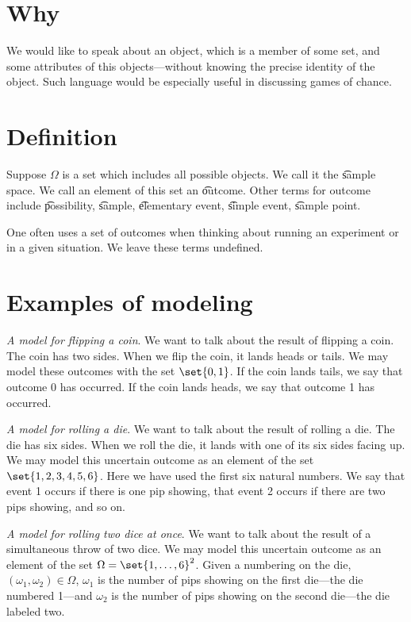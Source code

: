 

\section*{Why}

We would like to speak about an object, which is a member of some set, and some attributes of this objects---without knowing the precise identity of the object.
Such language would be especially useful in discussing games of chance.

\section*{Definition}

Suppose $\Omega $ is a set which includes all possible objects.
We call it the \t{sample space}.
We call an element of this set an \t{outcome}.
Other terms for outcome include \t{possibility}, \t{sample}, \t{elementary event}, \t{simple event}, \t{sample point}.

One often uses a set of outcomes when thinking about running an experiment or in a given situation.
We leave these terms undefined.

\section*{Examples of modeling}

\textit{A model for flipping a coin}.
We want to talk about the result of flipping a coin.
The coin has two sides.
When we flip the coin, it lands heads or tails.
We may model these outcomes with the set $\set{0, 1}$.
If the coin lands tails, we say that outcome 0 has occurred.
If the coin lands heads, we say that outcome 1 has occurred.

\textit{A model for rolling a die}.
We want to talk about the result of rolling a die.
The die has six sides.
When we roll the die, it lands with one of its six sides facing up.
We may model this uncertain outcome as an element of the set $\set{1, 2, 3, 4, 5, 6}$.
Here we have used the first six natural numbers.
We say that event 1 occurs if there is one pip showing, that event 2 occurs if there are two pips showing, and so on.

\textit{A model for rolling two dice at once}.
We want to talk about the result of a simultaneous throw of two dice.
We may model this uncertain outcome as an element of the set $\Omega  = \set{1, \dots , 6}^2$.
Given a numbering on the die, $(\omega _1, \omega _2) \in \Omega $, $\omega _1$ is the number of pips showing on the first die---the die numbered 1---and $\omega _2$ is the number of pips showing on the second die---the die labeled two.

